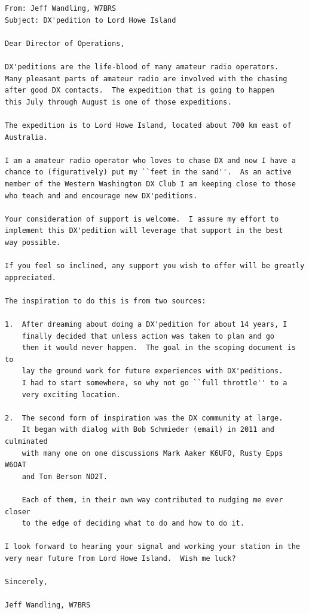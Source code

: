 \documentclass[11pt]{article}
\begin{document}
\begin{Verbatim}[fontsize=\small]
From: Jeff Wandling, W7BRS
Subject: DX'pedition to Lord Howe Island

Dear Director of Operations,

DX'peditions are the life-blood of many amateur radio operators.
Many pleasant parts of amateur radio are involved with the chasing
after good DX contacts.  The expedition that is going to happen
this July through August is one of those expeditions.

The expedition is to Lord Howe Island, located about 700 km east of Australia.

I am a amateur radio operator who loves to chase DX and now I have a 
chance to (figuratively) put my ``feet in the sand''.  As an active
member of the Western Washington DX Club I am keeping close to those
who teach and and encourage new DX'peditions.

Your consideration of support is welcome.  I assure my effort to 
implement this DX'pedition will leverage that support in the best
way possible.

If you feel so inclined, any support you wish to offer will be greatly
appreciated.

The inspiration to do this is from two sources:

1.  After dreaming about doing a DX'pedition for about 14 years, I
    finally decided that unless action was taken to plan and go
    then it would never happen.  The goal in the scoping document is to 
    lay the ground work for future experiences with DX'peditions.  
    I had to start somewhere, so why not go ``full throttle'' to a 
    very exciting location.

2.  The second form of inspiration was the DX community at large.
    It began with dialog with Bob Schmieder (email) in 2011 and culminated
    with many one on one discussions Mark Aaker K6UFO, Rusty Epps W6OAT
    and Tom Berson ND2T.

    Each of them, in their own way contributed to nudging me ever closer 
    to the edge of deciding what to do and how to do it.

I look forward to hearing your signal and working your station in the
very near future from Lord Howe Island.  Wish me luck?

Sincerely,

Jeff Wandling, W7BRS
\end{Verbatim}

\newpage
\printglossary
\newpage
{}
\printindex
\end{document}
